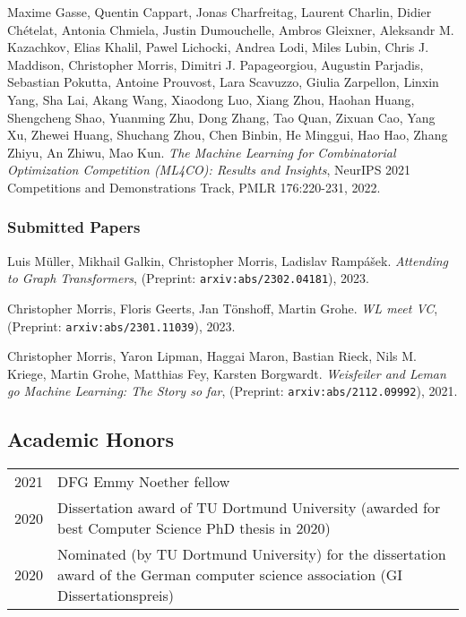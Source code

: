 \documentclass[11pt, a4paper, DIV=12]{scrartcl}
\begin{document}
\begin{thebibliography}{15}
	Maxime Gasse, Quentin Cappart, Jonas Charfreitag, Laurent Charlin, Didier Chételat, Antonia Chmiela, Justin Dumouchelle, Ambros Gleixner, Aleksandr M. Kazachkov, Elias Khalil, Pawel Lichocki, Andrea Lodi, Miles Lubin, Chris J. Maddison, Christopher Morris, Dimitri J. Papageorgiou, Augustin Parjadis, Sebastian Pokutta, Antoine Prouvost, Lara Scavuzzo, Giulia Zarpellon, Linxin Yang, Sha Lai, Akang Wang, Xiaodong Luo, Xiang Zhou, Haohan Huang, Shengcheng Shao, Yuanming Zhu, Dong Zhang, Tao Quan, Zixuan Cao, Yang Xu, Zhewei Huang, Shuchang Zhou, Chen Binbin, He Minggui, Hao Hao, Zhang Zhiyu, An Zhiwu, Mao Kun.
	\emph{The Machine Learning for Combinatorial Optimization Competition (ML4CO): Results and Insights}, NeurIPS 2021 Competitions and Demonstrations Track, PMLR 176:220-231, 2022.

	\subsubsection*{Submitted Papers}

	Luis Müller, Mikhail Galkin, Christopher Morris, Ladislav Rampášek.
	\emph{Attending to Graph Transformers}, (Preprint: \texttt{arxiv:abs/2302.04181}), 2023.

	Christopher Morris, Floris Geerts, Jan Tönshoff, Martin Grohe.
	\emph{WL meet VC}, (Preprint: \texttt{arxiv:abs/2301.11039}), 2023.

	Christopher Morris, Yaron Lipman, Haggai Maron, Bastian Rieck, Nils M. Kriege, Martin Grohe, Matthias Fey, Karsten Borgwardt.
	\emph{Weisfeiler and Leman go Machine Learning: The Story so far}, (Preprint: \texttt{arxiv:abs/2112.09992}), 2021.
\end{thebibliography}

\subsection*{Academic Honors}
 \tabulinesep=0.8mm
\begin{longtabu}{p{2.1cm}p{12.0cm}}
	2021 & DFG Emmy Noether fellow                                                                                                             \\
	2020 & Dissertation award of TU Dortmund University (awarded for best Computer Science PhD thesis in 2020)                                 \\
	2020 & Nominated (by TU Dortmund University) for the dissertation award of the German computer science association (GI Dissertationspreis) \\
\end{longtabu}
\end{document}

